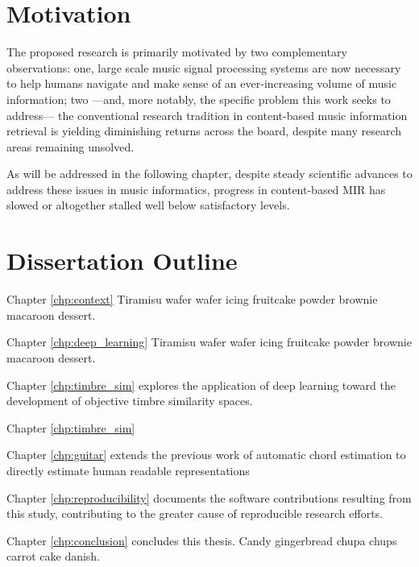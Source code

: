 \section{Motivation}


The proposed research is primarily motivated by two complementary observations:
one, large scale music signal processing systems are now necessary to help humans navigate and make sense of an ever-increasing volume of music information;
two ---and, more notably, the specific problem this work seeks to address--- the conventional research tradition in content-based music information retrieval is yielding diminishing returns across the board, despite many research areas remaining unsolved.



As will be addressed in the following chapter, despite steady scientific advances to address these issues in music informatics, progress in content-based MIR has slowed or altogether stalled well below satisfactory levels. %



\section{Dissertation Outline}
\label{sec:outline}
\begin{description}
\item Chapter \ref{chp:context} Tiramisu wafer wafer icing fruitcake powder brownie macaroon dessert.

\item Chapter \ref{chp:deep_learning} Tiramisu wafer wafer icing fruitcake powder brownie macaroon dessert.

\item Chapter \ref{chp:timbre_sim} explores the application of deep learning toward the development of objective timbre similarity spaces.

\item Chapter \ref{chp:timbre_sim}

\item Chapter \ref{chp:guitar} extends the previous work of automatic chord estimation to directly estimate  human readable representations

\item Chapter \ref{chp:reproducibility} documents the software contributions resulting from this study, contributing to the greater cause of reproducible research efforts.

\item Chapter \ref{chp:conclusion} concludes this thesis. Candy gingerbread chupa chups carrot cake danish.
\end{description}

